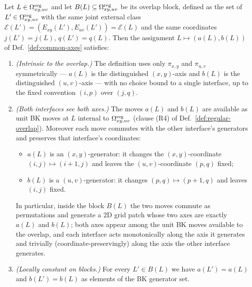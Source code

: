 \begin{lemma}\label{lem:common-axes}
Let $L\in\Omega^{\mathrm{reg}}_{xy,uv}$ and let $B(L)\subseteq\Omega^{\mathrm{reg}}_{xy,uv}$ be its
overlap block, defined as the set of $L'\in\Omega^{\mathrm{reg}}_{xy,uv}$ with the same
joint external class $\mathcal E(L')=(E_{xy}(L'),E_{uv}(L'))=\mathcal E(L)$
and the same coordinates $j(L')=j(L)$, $q(L')=q(L)$. Then the
assignment $L\mapsto (a(L),b(L))$ of Def.~\ref{def:common-axes} satisfies:
\begin{enumerate}[nosep,label=(G5.\arabic*)]
  \item \emph{(Intrinsic to the overlap.)} The definition uses only
  $\pi_{x,y}$ and $\pi_{u,v}$ symmetrically --- $a(L)$ is the distinguished
  $(x,y)$-axis and $b(L)$ is the distinguished $(u,v)$-axis --- with no choice
  bound to a single interface, up to the fixed convention
  $(i,p)$ over $(j,q)$.
  \item \emph{(Both interfaces see both axes.)} The moves $a(L)$ and $b(L)$
  are available as unit BK moves at $L$ internal to $\Omega^{\mathrm{reg}}_{xy,uv}$
  (clause (R4) of Def.~\ref{def:regular-overlap}). Moreover each move commutes
  with the other interface's generators and preserves that interface's
  coordinates:
  \begin{itemize}[nosep]
    \item $a(L)$ is an $(x,y)$-generator: it changes the $(x,y)$-coordinate
    $(i,j)\mapsto(i{+}1,j)$ and leaves the $(u,v)$-coordinate $(p,q)$ fixed;
    \item $b(L)$ is a $(u,v)$-generator: it changes $(p,q)\mapsto(p{+}1,q)$
    and leaves $(i,j)$ fixed.
  \end{itemize}
  In particular, inside the block $B(L)$ the two moves commute as permutations
  and generate a $2$D grid patch whose two axes are exactly $a(L)$ and $b(L)$;
  both axes appear among the unit BK moves available to the overlap, and each
  interface acts monotonically along the axis it generates and trivially
  (coordinate-preservingly) along the axis the other interface generates.
  \item \emph{(Locally constant on blocks.)} For every $L'\in B(L)$ we have
  $a(L')=a(L)$ and $b(L')=b(L)$ as elements of the BK generator set.
\end{enumerate}
\end{lemma}


